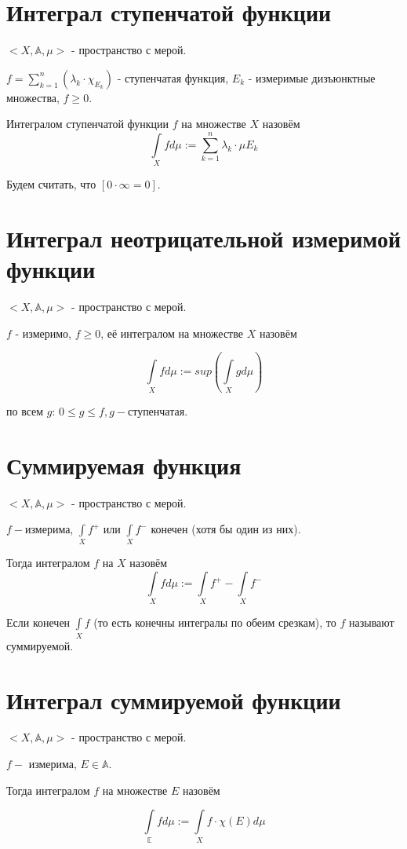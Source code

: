 \documentclass[paper=a4, fontsize=17pt]{article}
\begin{document}
	\section{Интеграл ступенчатой функции}
	$<X, \mathds{A}, \mu>$ - пространство с мерой.

	$f = \sum\limits_{k = 1}^{n}(\lambda_k \cdot \chi_{E_k})$ - ступенчатая функция, $E_k$ - измеримые дизъюнктные множества, $f \geqslant 0$.

	Интегралом ступенчатой функции $f$ на множестве $X$ назовём $$\int\limits_X f d\mu := \sum\limits_{k = 1}^{n} \lambda_k \cdot \mu E_k$$

	Будем считать, что $[0 \cdot \infty = 0]$.

	\section{Интеграл неотрицательной измеримой функции}
	$<X, \mathds{A}, \mu>$ - пространство с мерой.

	$f$ - измеримо, $f \geqslant 0$, её интегралом на множестве $X$ назовём

	$$\int\limits_{X} f d\mu := sup (\int\limits_X g d\mu)$$

	по всем $g$: $0 \leqslant g \leqslant f, g - $ступенчатая.

	\section{Суммируемая функция}
	$<X, \mathds{A}, \mu>$ - пространство с мерой.

	$f - $измерима, $\int\limits_{X}f^+$ или $\int\limits_{X}f^-$ конечен (хотя бы один из них).

	Тогда интегралом $f$ на $X$ назовём $$\int\limits_{X}f d\mu := \int\limits_{X}f^+ - \int\limits_{X}f^-$$

	Если конечен $\int\limits_{X} f$ (то есть конечны интегралы по обеим срезкам), то $f$ называют суммируемой.

	\section{Интеграл суммируемой функции}
	$<X, \mathds{A}, \mu>$ - пространство с мерой.

	$f -$ измерима, $E \in \mathds{A}$.

	Тогда интегралом $f$ на множестве $E$ назовём

	$$\int\limits_{\mathds{E}}f d\mu := \int\limits_{X}f \cdot \chi(E) d\mu$$
\end{document}

